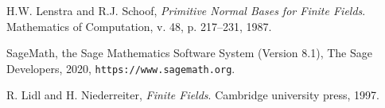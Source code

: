 \documentclass[12pt]{article}
\begin{document}
\begin{thebibliography}{99}
 H.W. Lenstra and R.J. Schoof, {\em Primitive Normal Bases for Finite Fields}.
Mathematics of Computation, v. 48, p. 217--231, 1987.

%

 SageMath, the Sage Mathematics Software System (Version 8.1),
   The Sage Developers, 2020, \texttt{https://www.sagemath.org}.
   
   
 R. Lidl and H. Niederreiter, {\em Finite Fields}. Cambridge 
university press, 1997.


\end{thebibliography}
\end{document}
